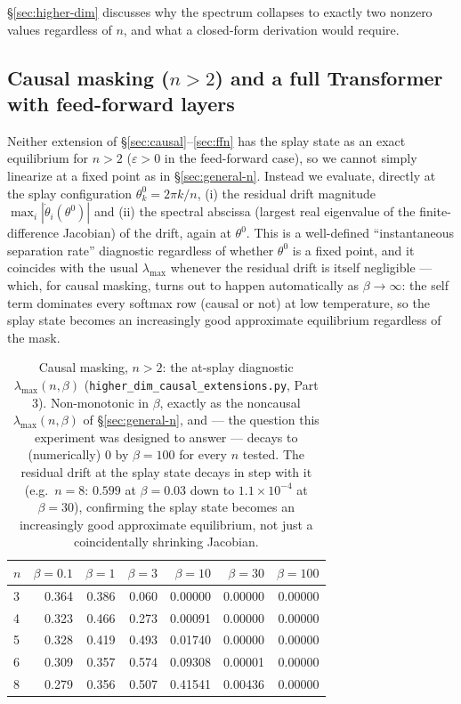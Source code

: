 \documentclass[11pt]{article}
\begin{document}
\S\ref{sec:higher-dim} discusses why the spectrum collapses to exactly two nonzero values regardless of $n$, and what a closed-form derivation would require.

\subsection{Causal masking ($n>2$) and a full Transformer with feed-forward layers}
\label{sec:causal-ffn-numerics}

Neither extension of \S\ref{sec:causal}--\ref{sec:ffn} has the splay state as an exact equilibrium for $n>2$ ($\varepsilon>0$ in the feed-forward case), so we cannot simply linearize at a fixed point as in \S\ref{sec:general-n}. Instead we evaluate, directly at the splay configuration $\theta_k^0=2\pi k/n$, (i) the residual drift magnitude $\max_i|\dot\theta_i(\theta^0)|$ and (ii) the spectral abscissa (largest real eigenvalue of the finite-difference Jacobian) of the drift, again at $\theta^0$. This is a well-defined ``instantaneous separation rate'' diagnostic regardless of whether $\theta^0$ is a fixed point, and it coincides with the usual $\lambda_{\max}$ whenever the residual drift is itself negligible --- which, for causal masking, turns out to happen automatically as $\beta\to\infty$: the self term dominates every softmax row (causal or not) at low temperature, so the splay state becomes an increasingly good approximate equilibrium regardless of the mask.

\begin{table}[h]
\centering
\begin{tabular}{@{}l r r r r r r@{}}
\toprule
$n$ & $\beta=0.1$ & $\beta=1$ & $\beta=3$ & $\beta=10$ & $\beta=30$ & $\beta=100$ \\
\midrule
3 & 0.364 & 0.386 & 0.060 & 0.00000 & 0.00000 & 0.00000 \\
4 & 0.323 & 0.466 & 0.273 & 0.00091 & 0.00000 & 0.00000 \\
5 & 0.328 & 0.419 & 0.493 & 0.01740 & 0.00000 & 0.00000 \\
6 & 0.309 & 0.357 & 0.574 & 0.09308 & 0.00001 & 0.00000 \\
8 & 0.279 & 0.356 & 0.507 & 0.41541 & 0.00436 & 0.00000 \\
\bottomrule
\end{tabular}
\caption{Causal masking, $n>2$: the at-splay diagnostic $\lambda_{\max}(n,\beta)$ (\texttt{higher\_dim\_causal\_extensions.py}, Part 3). Non-monotonic in $\beta$, exactly as the noncausal $\lambda_{\max}(n,\beta)$ of \S\ref{sec:general-n}, and --- the question this experiment was designed to answer --- decays to (numerically) $0$ by $\beta=100$ for every $n$ tested. The residual drift at the splay state decays in step with it (e.g.\ $n{=}8$: $0.599$ at $\beta{=}0.03$ down to $1.1\times10^{-4}$ at $\beta{=}30$), confirming the splay state becomes an increasingly good approximate equilibrium, not just a coincidentally shrinking Jacobian.}
\label{tab:causal-numerics}
\end{table}
\end{document}
